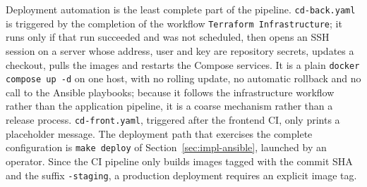 Deployment automation is the least complete part of the pipeline. \texttt{cd-back.yaml} is triggered by the completion of the workflow \texttt{Terraform Infrastructure}; it runs only if that run succeeded and was not scheduled, then opens an SSH session on a server whose address, user and key are repository secrets, updates a checkout, pulls the images and restarts the Compose services. It is a plain \texttt{docker compose up -d} on one host, with no rolling update, no automatic rollback and no call to the Ansible playbooks; because it follows the infrastructure workflow rather than the application pipeline, it is a coarse mechanism rather than a release process. \texttt{cd-front.yaml}, triggered after the frontend CI, only prints a placeholder message. The deployment path that exercises the complete configuration is \texttt{make deploy} of Section~\ref{sec:impl-ansible}, launched by an operator. Since the CI pipeline only builds images tagged with the commit SHA and the suffix \texttt{-staging}, a production deployment requires an explicit image tag.
